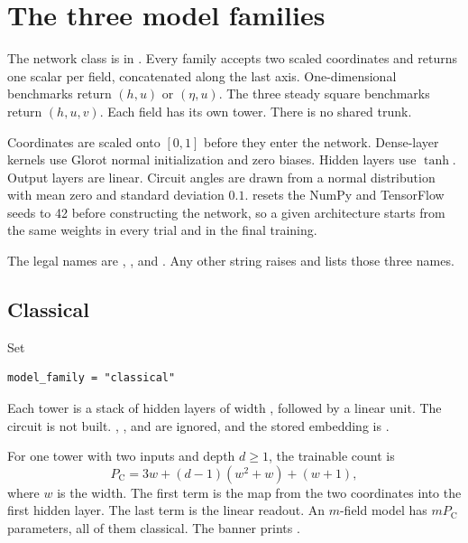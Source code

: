 \chapter{The three model families}
\label{ch:families}

The network class is  in .
Every family accepts two scaled coordinates and returns one scalar per field, concatenated along the last axis.
One-dimensional benchmarks return \((h,u)\) or \((\eta,u)\).
The three steady square benchmarks return \((h,u,v)\).
Each field has its own tower.
There is no shared trunk.

Coordinates are scaled onto \([0,1]\) before they enter the network.
Dense-layer kernels use Glorot normal initialization and zero biases.
Hidden layers use \(\tanh\).
Output layers are linear.
Circuit angles are drawn from a normal distribution with mean zero and standard deviation \(0.1\).
 resets the NumPy and TensorFlow seeds to 42 before constructing the network, so a given architecture starts from the same weights in every trial and in the final training.

The legal names are , , and .
Any other string raises  and lists those three names.

\section{Classical}
\label{sec:classical}

Set
\begin{lstlisting}
model_family = "classical"
\end{lstlisting}
Each tower is a stack of  hidden layers of width , followed by a linear unit.
The circuit is not built.
, , and  are ignored, and the stored embedding is .

For one tower with two inputs and depth \(d\ge 1\), the trainable count is
\begin{equation}
\label{eq:classical}
P_{\mathrm{C}}
= 3w + (d-1)(w^{2}+w) + (w+1),
\end{equation}
where \(w\) is the width.
The first term is the map from the two coordinates into the first hidden layer.
The last term is the linear readout.
An \(m\)-field model has \(m P_{\mathrm{C}}\) parameters, all of them classical.
The banner prints .

